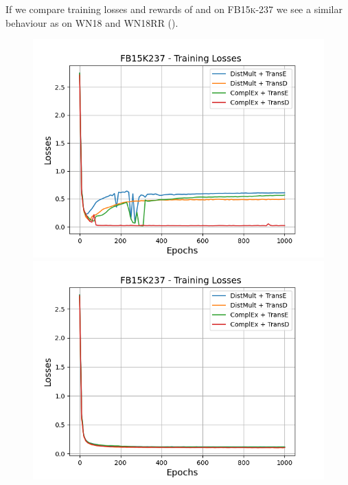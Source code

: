 If we compare training losses and rewards of \usmax and \usmax on \textsc{FB15k-237} we see a similar behaviour as on \textsc{WN18} and \textsc{WN18RR} ().
\begin{figure}[H]
    \centering
    \begin{minipage}{.5\textwidth}
      \centering
      \includegraphics[width=0.9\linewidth]{figures/results/gan_train/not_pretrained/uncertainty/max/entropy/fb15k237/1k_epochs/uncertainty_fb15k237_losses.png}
    \end{minipage}%
    \begin{minipage}{.5\textwidth}
      \centering
      \includegraphics[width=0.9\linewidth]{figures/results/gan_train/not_pretrained/uncertainty/max_distribution/entropy/fb15k237/1k_epochs/uncertainty_fb15k237_losses.png}
    \end{minipage}

\end{figure}
